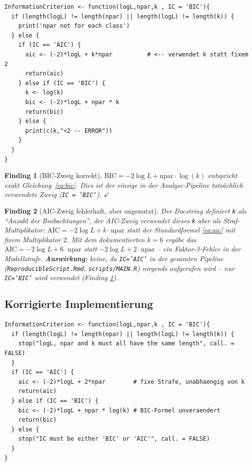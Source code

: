 \documentclass[11pt,a4paper]{article}
\newtheorem{finding}{Finding}
\begin{document}
\begin{lstlisting}
InformationCriterion <- function(logL,npar,k , IC = 'BIC'){
  if (length(logL) != length(npar) || length(logL) != length(k)) {
    print('npar not for each class')
  } else {
    if (IC == 'AIC') {
      aic <- (-2)*logL + k*npar          # <-- verwendet k statt fixem 2
      return(aic)
    } else if (IC == 'BIC') {
      k <- log(k)
      bic <- (-2)*logL + npar * k
      return(bic)
    } else {
      print(c(k,"<2 -- ERROR"))
    }
  }
}
\end{lstlisting}

\begin{finding}[BIC-Zweig korrekt]
\label{find:bic-ok}
$\text{BIC} = -2\log L + \text{npar}\cdot\log(k)$ entspricht exakt
Gleichung~\eqref{eq:bic}. Dies ist der einzige in der Analyse-Pipeline
tatsächlich verwendete Zweig (\texttt{IC = 'BIC'}). $\checkmark$
\end{finding}

\begin{finding}[AIC-Zweig fehlerhaft, aber ungenutzt]
\label{find:aic-bug}
Der Docstring definiert \texttt{k} als ``Anzahl der Beobachtungen'', der
AIC-Zweig verwendet dieses \texttt{k} aber als Straf-Multiplikator:
$\text{AIC} = -2\log L + k \cdot \text{npar}$ statt der Standardformel
\eqref{eq:aic} mit fixem Multiplikator $2$. Mit dem dokumentierten
$k=6$ ergäbe das $\text{AIC} = -2\log L + 6\cdot\text{npar}$ statt
$-2\log L + 2\cdot\text{npar}$ -- ein Faktor-3-Fehler in der Modellstrafe.
\textbf{Auswirkung:} keine, da \texttt{IC='AIC'} in der gesamten Pipeline
(\texttt{ReproducibleScript.Rmd}, \texttt{scripts/MAIN.R}) nirgends
aufgerufen wird -- nur \texttt{IC='BIC'} wird verwendet (Finding
\ref{find:bic-ok}).
\end{finding}

\subsection{Korrigierte Implementierung}

\begin{lstlisting}
InformationCriterion <- function(logL,npar,k , IC = 'BIC'){
  if (length(logL) != length(npar) || length(logL) != length(k)) {
    stop("logL, npar and k must all have the same length", call. = FALSE)
  }
  if (IC == 'AIC') {
    aic <- (-2)*logL + 2*npar        # fixe Strafe, unabhaengig von k
    return(aic)
  } else if (IC == 'BIC') {
    bic <- (-2)*logL + npar * log(k) # BIC-Formel unveraendert
    return(bic)
  } else {
    stop("IC must be either 'BIC' or 'AIC'", call. = FALSE)
  }
}
\end{lstlisting}
\end{document}

